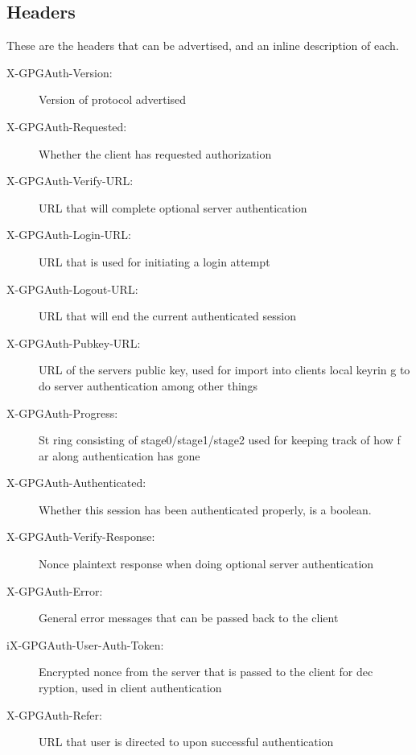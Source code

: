 \documentclass[11pt]{article}
\begin{document}
\subsection{Headers} \label{subsec:headers}
These are the headers that can be advertised, and an inline description of each.
\begin{description}
	\item[X-GPGAuth-Version:] Version of protocol advertised
	\item[X-GPGAuth-Requested:] Whether the client has requested authorization
	\item[X-GPGAuth-Verify-URL:] URL that will complete optional server authentication
	\item[X-GPGAuth-Login-URL:] URL that is used for initiating a login attempt
	\item[X-GPGAuth-Logout-URL:] URL that will end the current authenticated session
	\item[X-GPGAuth-Pubkey-URL:]  URL of the servers public key, used for import into clients local keyrin g to do server authentication among other things
	\item[X-GPGAuth-Progress:] St ring consisting of stage0/stage1/stage2 used for keeping track of how f ar along authentication has gone
	\item[X-GPGAuth-Authenticated:] Whether this session has been authenticated properly, is a boolean. 
	\item[X-GPGAuth-Verify-Response:] Nonce plaintext response when doing optional server authentication 
	\item[X-GPGAuth-Error:] General error messages that can be passed back to the client
	\item[iX-GPGAuth-User-Auth-Token:] Encrypted nonce from the server that is passed to the client for dec ryption, used in client authentication
	\item[X-GPGAuth-Refer:] URL that user is directed to upon successful authentication
\end{description}
\end{document}

